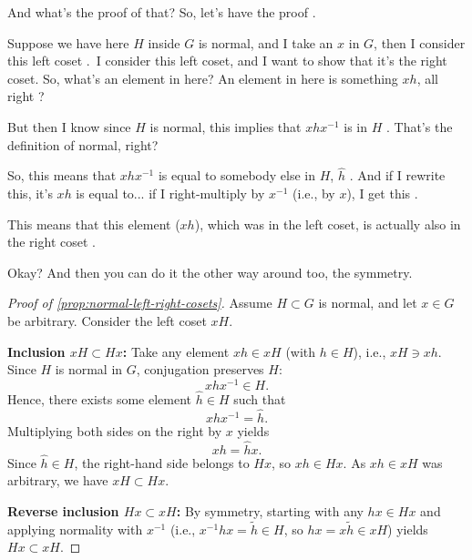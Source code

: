\begin{proofWrapper}

\begin{speech}[00:07:03 - 00:08:20]
And what's the proof of that? So, let's have the proof .

Suppose we have here $H$ inside $G$ is normal, and I take an $x$ in $G$, then I consider this left coset .\ I consider this left coset, and I want to show that it's the right coset. So, what's an element in here? An element in here is something $xh$, all right ?

But then I know since $H$ is normal, this implies that $x h x^{-1}$ is in $H$ . That's the definition of normal, right?

So, this means that $x h x^{-1}$ is equal to somebody else in $H$, $\hat{h}$ . And if I rewrite this, it's $xh$ is equal to... if I right-multiply by $x^{-1}$ (i.e., by $x$), I get this .

This means that this element ($xh$), which was in the left coset, is actually also in the right coset .

Okay? And then you can do it the other way around too, the symmetry.
\end{speech}

\begin{content}
\begin{proof}[Proof of \cref{prop:normal-left-right-cosets}]
Assume $H \subset G$ is normal, and let $x \in G$ be arbitrary. Consider the left coset $xH$.

\textbf{Inclusion $xH \subset Hx$:} Take any element $xh \in xH$ (with $h \in H$), i.e., $xH \ni xh$. Since $H$ is normal in $G$, conjugation preserves $H$:
\[
x h x^{-1} \in H.
\]
Hence, there exists some element $\hat{h} \in H$ such that
\[
x h x^{-1} = \hat{h}.
\]
Multiplying both sides on the right by $x$ yields
\[
xh = \hat{h}x.
\]
Since $\hat{h} \in H$, the right-hand side belongs to $Hx$, so $xh \in Hx$. As $xh \in xH$ was arbitrary, we have $xH \subset Hx$.

\textbf{Reverse inclusion $Hx \subset xH$:} By symmetry, starting with any $hx \in Hx$ and applying normality with $x^{-1}$ (i.e., $x^{-1} h x = \tilde{h} \in H$, so $hx = x \tilde{h} \in xH$) yields $Hx \subset xH$.


\end{proof}
\end{content}
\end{proofWrapper}
